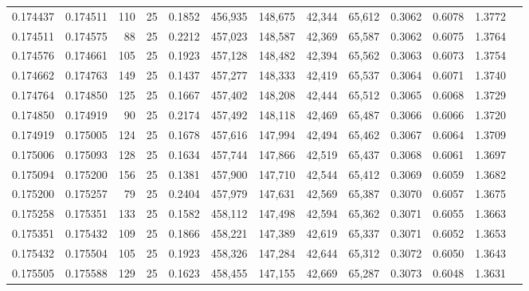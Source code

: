 \begin{tabular}{rrrrrrrrrrrrr}
0.174437 & 0.174511 &   110 &  25 &                                     0.1852 & 456,935 & 148,675 &  42,344 &  65,612 & 0.3062 & 0.6078 & 1.3772 \\
0.174511 & 0.174575 &    88 &  25 &                                     0.2212 & 457,023 & 148,587 &  42,369 &  65,587 & 0.3062 & 0.6075 & 1.3764 \\
0.174576 & 0.174661 &   105 &  25 &                                     0.1923 & 457,128 & 148,482 &  42,394 &  65,562 & 0.3063 & 0.6073 & 1.3754 \\
0.174662 & 0.174763 &   149 &  25 &                                     0.1437 & 457,277 & 148,333 &  42,419 &  65,537 & 0.3064 & 0.6071 & 1.3740 \\
0.174764 & 0.174850 &   125 &  25 &                                     0.1667 & 457,402 & 148,208 &  42,444 &  65,512 & 0.3065 & 0.6068 & 1.3729 \\
0.174850 & 0.174919 &    90 &  25 &                                     0.2174 & 457,492 & 148,118 &  42,469 &  65,487 & 0.3066 & 0.6066 & 1.3720 \\
0.174919 & 0.175005 &   124 &  25 &                                     0.1678 & 457,616 & 147,994 &  42,494 &  65,462 & 0.3067 & 0.6064 & 1.3709 \\
0.175006 & 0.175093 &   128 &  25 &                                     0.1634 & 457,744 & 147,866 &  42,519 &  65,437 & 0.3068 & 0.6061 & 1.3697 \\
0.175094 & 0.175200 &   156 &  25 &                                     0.1381 & 457,900 & 147,710 &  42,544 &  65,412 & 0.3069 & 0.6059 & 1.3682 \\
0.175200 & 0.175257 &    79 &  25 &                                     0.2404 & 457,979 & 147,631 &  42,569 &  65,387 & 0.3070 & 0.6057 & 1.3675 \\
0.175258 & 0.175351 &   133 &  25 &                                     0.1582 & 458,112 & 147,498 &  42,594 &  65,362 & 0.3071 & 0.6055 & 1.3663 \\
0.175351 & 0.175432 &   109 &  25 &                                     0.1866 & 458,221 & 147,389 &  42,619 &  65,337 & 0.3071 & 0.6052 & 1.3653 \\
0.175432 & 0.175504 &   105 &  25 &                                     0.1923 & 458,326 & 147,284 &  42,644 &  65,312 & 0.3072 & 0.6050 & 1.3643 \\
0.175505 & 0.175588 &   129 &  25 &                                     0.1623 & 458,455 & 147,155 &  42,669 &  65,287 & 0.3073 & 0.6048 & 1.3631 \\

\end{tabular}
